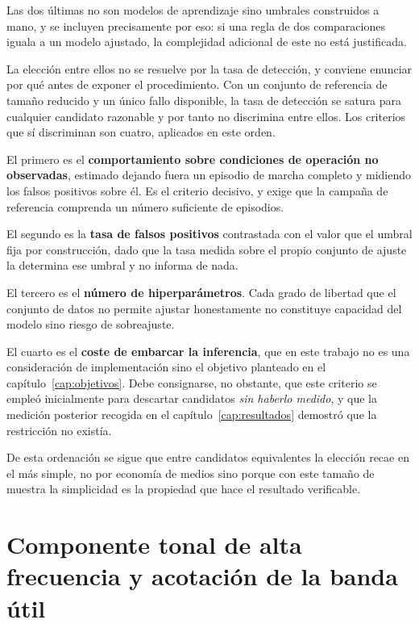 Las dos últimas no son modelos de aprendizaje sino umbrales construidos a mano, y se incluyen
precisamente por eso: si una regla de dos comparaciones iguala a un modelo ajustado, la
complejidad adicional de este no está justificada.

La elección entre ellos no se resuelve por la tasa de detección, y conviene enunciar por qué antes de
exponer el procedimiento. Con un conjunto de referencia de tamaño reducido y un único fallo
disponible, la tasa de detección se satura para cualquier candidato razonable y por tanto no
discrimina entre ellos. Los criterios que sí discriminan son cuatro, aplicados en este orden.

El primero es el \textbf{comportamiento sobre condiciones de operación no observadas}, estimado
dejando fuera un episodio de marcha completo y midiendo los falsos positivos sobre él. Es el
criterio decisivo, y exige que la campaña de referencia comprenda un número suficiente de
episodios.

El segundo es la \textbf{tasa de falsos positivos} contrastada con el valor que el umbral fija
por construcción, dado que la tasa medida sobre el propio conjunto de ajuste la determina ese
umbral y no informa de nada.

El tercero es el \textbf{número de hiperparámetros}. Cada grado de libertad que el conjunto de
datos no permite ajustar honestamente no constituye capacidad del modelo sino riesgo de
sobreajuste.

El cuarto es el \textbf{coste de embarcar la inferencia}, que en este trabajo no es una
consideración de implementación sino el objetivo planteado en el capítulo~\ref{cap:objetivos}.
Debe consignarse, no obstante, que este criterio se empleó inicialmente para descartar
candidatos \textit{sin haberlo medido}, y que la medición posterior recogida en el
capítulo~\ref{cap:resultados} demostró que la restricción no existía.

De esta ordenación se sigue que entre candidatos equivalentes la elección recae en el más
simple, no por economía de medios sino porque con este tamaño de muestra la simplicidad es la
propiedad que hace el resultado verificable.

\section{Componente tonal de alta frecuencia y acotación de la banda útil}

